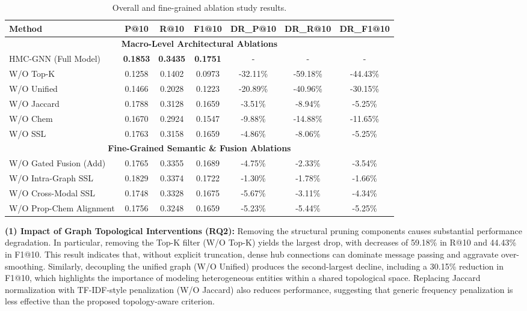 \documentclass[a4paper,fleqn]{cas-dc}
\begin{document}
\begin{table}[width=\textwidth,cols=7,pos=htbp]
\caption{Overall and fine-grained ablation study results.}\label{tbl4}
\footnotesize
\begin{tabular*}{\textwidth}{@{\extracolsep{\fill}} l c c c c c c @{}}
\toprule
Method & P@10 & R@10 & F1@10 & DR\_P@10 & DR\_R@10 & DR\_F1@10 \\
\midrule
\multicolumn{7}{c}{\textbf{Macro-Level Architectural Ablations}} \\
\midrule
HMC-GNN (Full Model) & \textbf{0.1853} & \textbf{0.3435} & \textbf{0.1751} & - & - & - \\
W/O Top-K & 0.1258 & 0.1402 & 0.0973 & -32.11\% & -59.18\% & -44.43\% \\
W/O Unified & 0.1466 & 0.2028 & 0.1223 & -20.89\% & -40.96\% & -30.15\% \\
W/O Jaccard & 0.1788 & 0.3128 & 0.1659 & -3.51\% & -8.94\% & -5.25\% \\
W/O Chem & 0.1670 & 0.2924 & 0.1547 & -9.88\% & -14.88\% & -11.65\% \\
W/O SSL & 0.1763 & 0.3158 & 0.1659 & -4.86\% & -8.06\% & -5.25\% \\
\midrule
\multicolumn{7}{c}{\textbf{Fine-Grained Semantic \& Fusion Ablations}} \\
\midrule
W/O Gated Fusion (Add) & 0.1765 & 0.3355 & 0.1689 & -4.75\% & -2.33\% & -3.54\% \\
W/O Intra-Graph SSL & 0.1829 & 0.3374 & 0.1722 & -1.30\% & -1.78\% & -1.66\% \\
W/O Cross-Modal SSL & 0.1748 & 0.3328 & 0.1675 & -5.67\% & -3.11\% & -4.34\% \\
W/O Prop-Chem Alignment & 0.1756 & 0.3248 & 0.1659 & -5.23\% & -5.44\% & -5.25\% \\
\bottomrule
\end{tabular*}
\end{table}

\textbf{(1) Impact of Graph Topological Interventions (RQ2):}
Removing the structural pruning components causes substantial performance degradation. In particular, removing the Top-K filter (W/O Top-K) yields the largest drop, with decreases of 59.18\% in R@10 and 44.43\% in F1@10. This result indicates that, without explicit truncation, dense hub connections can dominate message passing and aggravate over-smoothing. Similarly, decoupling the unified graph (W/O Unified) produces the second-largest decline, including a 30.15\% reduction in F1@10, which highlights the importance of modeling heterogeneous entities within a shared topological space. Replacing Jaccard normalization with TF-IDF-style penalization (W/O Jaccard) also reduces performance, suggesting that generic frequency penalization is less effective than the proposed topology-aware criterion.
\end{document}
